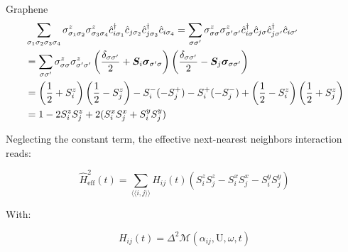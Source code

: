 \begin{section}{Graphene}
\begin{align*}
&\sum_{\sigma_1 \sigma_2 \sigma_3 \sigma_4} \sigma_{\sigma_1 \sigma_2}^z\sigma_{\sigma_3 \sigma_4}^z \hat{c}_{i\sigma_1}^\dagger\hat{c}_{j\sigma_2}\hat{c}_{j\sigma_3}^\dagger\hat{c}_{i\sigma_4} = \sum_{\sigma \sigma'} \sigma_{\sigma \sigma}^z\sigma_{\sigma' \sigma'}^z \hat{c}_{i\sigma}^\dagger\hat{c}_{j\sigma}\hat{c}_{j\sigma'}^\dagger\hat{c}_{i\sigma'} \\
&= \sum_{\sigma \sigma'} \sigma_{\sigma \sigma}^z\sigma_{\sigma' \sigma'}^z \left( \frac{\delta_{\sigma\sigma'}}{2} + \boldsymbol{S}_i\boldsymbol{\sigma}_{\sigma'\sigma}\right)\left( \frac{\delta_{\sigma\sigma'}}{2} - \boldsymbol{S}_j\boldsymbol{\sigma}_{\sigma\sigma'}\right) \\
&= \left( \frac{1}{2}+S_i^z \right) \left( \frac{1}{2}-S_j^z \right) - S_i^-(-S_j^+)-S_i^+(-S_j^-) + \left( \frac{1}{2}-S_i^z \right) \left( \frac{1}{2}+S_j^z \right) \\
&= 1-2S_i^zS_j^z+2(S_i^xS_j^x+S_i^yS_j^y)
\end{align*}

Neglecting the constant term, the effective next-nearest neighbors interaction reads:

\begin{equation}
\hat{H}_{\text{eff}}^2(t) = \sum_{\langle \langle i,j \rangle \rangle} H_{ij}(t) (S_i^zS_j^z - S_i^xS_j^x - S_i^yS_j^y)
\end{equation}

With:

\begin{equation}
H_{ij}(t) = \Delta^2 \mathcal{M}(\alpha_{ij}, \text{U}, \omega, t)
\end{equation}

\end{section}
